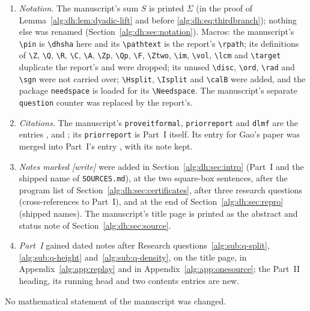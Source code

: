 \documentclass[11pt]{article}
\numberwithin{equation}{section}
\theoremstyle{plain}
\theoremstyle{plain}
\theoremstyle{plain}
\theoremstyle{definition}
\theoremstyle{definition}
\theoremstyle{definition}
\theoremstyle{remark}
\newcommand{\Z}{\mathbb Z}\newcommand{\Q}{\mathbb Q}
\newcommand{\R}{\mathbb R}\newcommand{\C}{\mathbb C}
\newcommand{\F}{\mathbb F}\newcommand{\A}{\mathbb A}\newcommand{\PP}{\mathbb P}
\newcommand{\Zp}{\Z_p}\newcommand{\Ztwo}{\Z_2}
\newcommand{\Qp}{\Q_p}\newcommand{\Oh}{\mathcal O}
\newcommand{\vol}{\operatorname{vol}}
\newcommand{\target}{\boldsymbol b}
\newcommand{\wtag}{\textup{[write]}}%
\newcommand{\rpath}[1]{\nolinkurl{#1}}
\newcommand{\dhsha}{\nolinkurl{1085b506d65e207a05b7e9c861bb1fe88432fe38}}
\newcommand{\Hsplit}{\mathcal H^{\mathrm{sp}}}
\newcommand{\Isplit}{\mathcal I^{\mathrm{sp}}}
\newcommand{\calB}{\mathcal B}
\begin{document}
\begin{enumerate}[label=(\arabic*)]
Theorem~\ref{alg:dh:thm:headline-count}, ``This settles the completely
split sector of the prior report's Research Question~12.3'', and the
matching sentence of the abstract (Section~\ref{alg:dh:sec:source}) are
printed with the restriction to square boxes $|A|,|B|\le T$ added and
marked \wtag. The theorem is unchanged; the sentence overstated it,
because Research question~\ref{alg:sub:q-height} asks for boxes
$|A|\le H_A$, $|B|\le H_B$. The delivered
\rpath{02-dense-hasse-STATUS.md} keeps the unrestricted wording.
\item \emph{Notation.} The manuscript's sum $S$ is printed $\Sigma$ (in
the proof of Lemma~\ref{alg:dh:lem:dyadic-lift} and before
\eqref{alg:dh:eq:thirdbranch}); nothing else was renamed
(Section~\ref{alg:dh:sec:notation}). Macros: the manuscript's \verb|\pin|
is \verb|\dhsha| here and its \verb|\pathtext| is the report's
\verb|\rpath|; its definitions of \verb|\Z|, \verb|\Q|, \verb|\R|,
\verb|\C|, \verb|\A|, \verb|\Zp|, \verb|\Qp|, \verb|\F|, \verb|\Ztwo|,
\verb|\im|, \verb|\vol|, \verb|\lcm| and \verb|\target| duplicate the
report's and were dropped; its unused \verb|\disc|, \verb|\ord|,
\verb|\rad| and \verb|\sgn| were not carried over; \verb|\Hsplit|,
\verb|\Isplit| and \verb|\calB| were added, and the package
\texttt{needspace} is loaded for its \verb|\Needspace|. The manuscript's
separate \texttt{question} counter was replaced by the report's.
\item \emph{Citations.} The manuscript's \texttt{proveitformal},
\texttt{priorreport} and \texttt{dlmf} are the entries
\cite{dh:proveitformal}, \cite{dh:priorreport} and \cite{dh:dlmf}; its
\texttt{priorreport} is Part~I itself. Its entry for Gao's paper was
merged into Part~I's entry \cite{gao}, with its note kept.
\item \emph{Notes marked \wtag} were added in
Section~\ref{alg:dh:sec:intro} (Part~I and the shipped name of
\texttt{SOURCES.md}), at the two square-box sentences, after the program
list of Section~\ref{alg:dh:sec:certificates}, after three research
questions (cross-references to Part~I), and at the end of
Section~\ref{alg:dh:sec:repro} (shipped names). The manuscript's title
page is printed as the abstract and status note of
Section~\ref{alg:dh:sec:source}.
\item \emph{Part~I} gained dated notes after Research
questions~\ref{alg:sub:q-split}, \ref{alg:sub:q-height}
and~\ref{alg:sub:q-density}, on the title page, in
Appendix~\ref{alg:app:replay} and in Appendix~\ref{alg:app:onesource};
the Part~II heading, its running head and two contents entries are new.
\end{enumerate}
No mathematical statement of the manuscript was changed.
\end{document}
